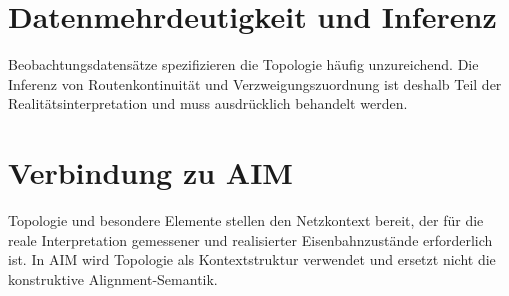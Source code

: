 \section{Datenmehrdeutigkeit und Inferenz}
Beobachtungsdatensätze spezifizieren die Topologie häufig unzureichend. Die
Inferenz von Routenkontinuität und Verzweigungszuordnung ist deshalb Teil der
Realitätsinterpretation und muss ausdrücklich behandelt werden.

\section{Verbindung zu AIM}
\begin{summary}
Topologie und besondere Elemente stellen den Netzkontext bereit, der für die
reale Interpretation gemessener und realisierter Eisenbahnzustände
erforderlich ist. In AIM wird Topologie als Kontextstruktur verwendet und
ersetzt nicht die konstruktive Alignment-Semantik.
\end{summary}
